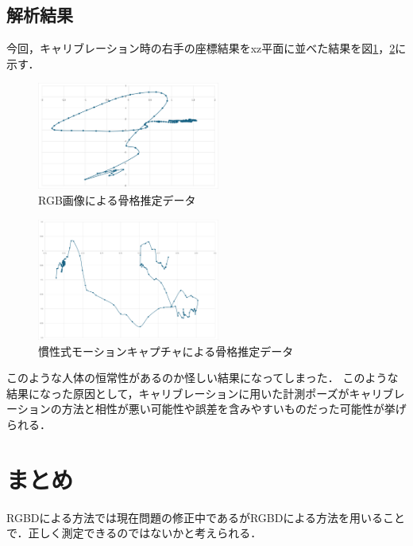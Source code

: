 \documentclass[titlepage]{jarticle}
\begin{document}
\subsection{解析結果}
今回，キャリブレーション時の右手の座標結果をxz平面に並べた結果を図\ref{1_media}，\ref{1_mocopi}に示す．
\begin{figure}[h]
  \centering
  \includegraphics[width=6cm]{img/1_media.png}
  \caption{RGB画像による骨格推定データ}
  \label{1_media}
\end{figure}

\begin{figure}[h]
  \centering
  \includegraphics[width=6cm]{img/1_mocopi.png}
  \caption{慣性式モーションキャプチャによる骨格推定データ}
  \label{1_mocopi}
\end{figure}

このような人体の恒常性があるのか怪しい結果になってしまった．
このような結果になった原因として，キャリブレーションに用いた計測ポーズがキャリブレーションの方法と相性が悪い可能性や誤差を含みやすいものだった可能性が挙げられる．
\section{まとめ}
RGBDによる方法では現在問題の修正中であるがRGBDによる方法を用いることで．正しく測定できるのではないかと考えられる．
\begin{thebibliography}{99}
  \small{




  }
\end{thebibliography}
\end{document}
